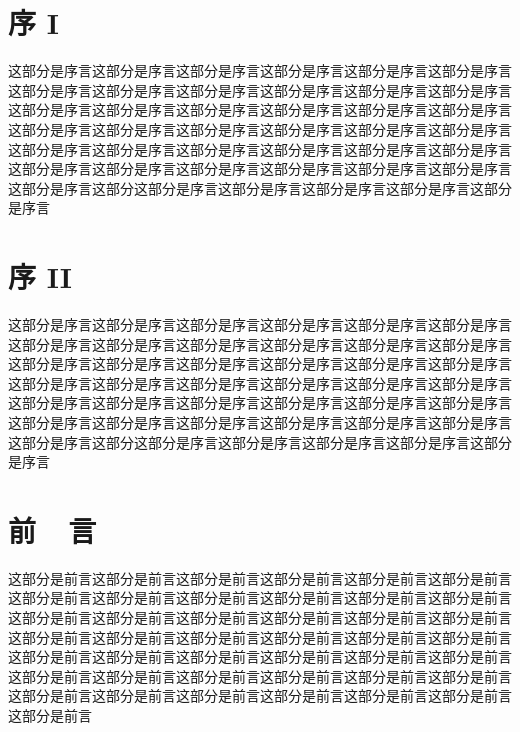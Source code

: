 \documentclass[openany,twoside,12pt]{book}
\theoremstyle{plain}
\begin{document}
\thispagestyle{empty}



\frontmatter   %




\chapter{序 I}

这部分是序言这部分是序言这部分是序言这部分是序言这部分是序言这部分是序言这部分是序言这部分是序言这部分是序言这部分是序言这部分是序言这部分是序言这部分是序言这部分是序言这部分是序言这部分是序言这部分是序言这部分是序言这部分是序言这部分是序言这部分是序言这部分是序言这部分是序言这部分是序言这部分是序言这部分是序言这部分是序言这部分是序言这部分是序言这部分是序言这部分是序言这部分是序言这部分是序言这部分是序言这部分是序言这部分是序言这部分是序言这部分这部分是序言这部分是序言这部分是序言这部分是序言这部分是序言


\chapter{序 II}

这部分是序言这部分是序言这部分是序言这部分是序言这部分是序言这部分是序言这部分是序言这部分是序言这部分是序言这部分是序言这部分是序言这部分是序言这部分是序言这部分是序言这部分是序言这部分是序言这部分是序言这部分是序言这部分是序言这部分是序言这部分是序言这部分是序言这部分是序言这部分是序言这部分是序言这部分是序言这部分是序言这部分是序言这部分是序言这部分是序言这部分是序言这部分是序言这部分是序言这部分是序言这部分是序言这部分是序言这部分是序言这部分这部分是序言这部分是序言这部分是序言这部分是序言这部分是序言

\chapter{前~~言}

这部分是前言这部分是前言这部分是前言这部分是前言这部分是前言这部分是前言这部分是前言这部分是前言这部分是前言这部分是前言这部分是前言这部分是前言这部分是前言这部分是前言这部分是前言这部分是前言这部分是前言这部分是前言这部分是前言这部分是前言这部分是前言这部分是前言这部分是前言这部分是前言这部分是前言这部分是前言这部分是前言这部分是前言这部分是前言这部分是前言这部分是前言这部分是前言这部分是前言这部分是前言这部分是前言这部分是前言这部分是前言这部分是前言这部分是前言这部分是前言这部分是前言这部分是前言这部分是前言
\end{document}
